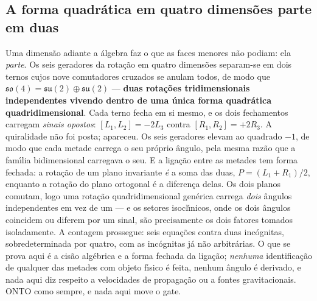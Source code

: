 \documentclass[11pt]{article}
\theoremstyle{definition}\newtheorem{deriv}{Derivação}
\begin{document}
\subsection*{A forma quadr\'atica em quatro dimens\~oes parte em duas}Uma dimens\~ao adiante a \'algebra faz o que as faces menores n\~ao podiam: ela \emph{parte}. Os seis geradores da rota\c{c}\~ao em quatro dimens\~oes separam-se em dois ternos cujos nove comutadores cruzados se anulam todos, de modo que $\mathfrak{so}(4) = \mathfrak{su}(2)\oplus\mathfrak{su}(2)$ --- \textbf{duas rota\c{c}\~oes tridimensionais independentes vivendo dentro de uma \'unica forma quadr\'atica quadridimensional}. Cada terno fecha em si mesmo, e os dois fechamentos carregam \emph{sinais opostos}: $[L_1,L_2] = -2L_3$ contra $[R_1,R_2] = +2R_3$. A quiralidade n\~ao foi posta; apareceu. Os seis geradores elevam ao quadrado $-1$, de modo que cada metade carrega o seu pr\'oprio \^angulo, pela mesma raz\~ao que a fam\'\i{}lia bidimensional carregava o seu. E a liga\c{c}\~ao entre as metades tem forma fechada: a rota\c{c}\~ao de um plano invariante \emph{\'e} a soma das duas, $P = (L_1+R_1)/2$, enquanto a rota\c{c}\~ao do plano ortogonal \'e a diferen\c{c}a delas. Os dois planos comutam, logo uma rota\c{c}\~ao quadridimensional gen\'erica carrega \emph{dois} \^angulos independentes em vez de um --- e os setores isocl\'\i{}nicos, onde os dois \^angulos coincidem ou diferem por um sinal, s\~ao precisamente os dois fatores tomados isoladamente. A contagem prossegue: seis equa\c{c}\~oes contra duas inc\'ognitas, sobredeterminada por quatro, com as inc\'ognitas j\'a n\~ao arbitr\'arias. O que se prova aqui \'e a cis\~ao alg\'ebrica e a forma fechada da liga\c{c}\~ao; \emph{nenhuma} identifica\c{c}\~ao de qualquer das metades com objeto f\'\i{}sico \'e feita, nenhum \^angulo \'e derivado, e nada aqui diz respeito a velocidades de propaga\c{c}\~ao ou a fontes gravitacionais. \textsf{ONTO} como sempre, e nada aqui move o gate.
\end{document}
